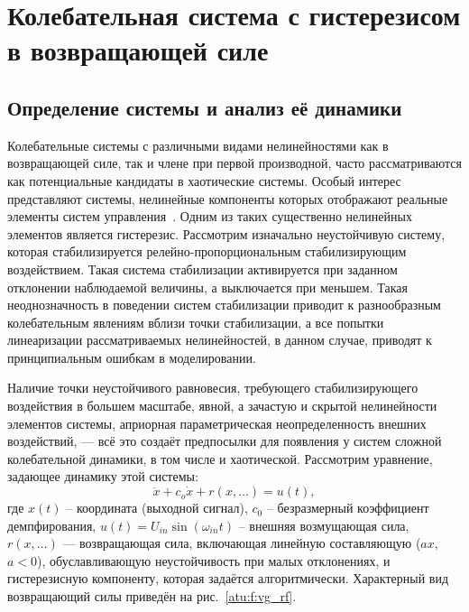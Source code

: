
\FloatBarrier
\section{Колебательная система с гистерезисом в возвращающей силе} %
\label{atu:sect:vglass}


\subsection{Определение системы и анализ её динамики} %

Колебательные системы с различными видами нелинейностями
как в возвращающей силе, так и члене при первой производной,
часто рассматриваются как потенциальные кандидаты в хаотические системы.
Особый интерес представляют системы, нелинейные компоненты которых
отображают реальные элементы систем управления~\cite{atu_st85,atu_ISDMCI2013,atu_asau20}.
Одним из таких существенно нелинейных элементов
является гистерезис. %
Рассмотрим изначально неустойчивую  систему,
которая стабилизируется релейно-пропорциональным
стабилизирующим воздействием.
Такая система стабилизации активируется при заданном отклонении наблюдаемой
величины, а выключается при меньшем. Такая неоднозначность в поведении
систем стабилизации приводит к разнообразным колебательным явлениям вблизи
точки стабилизации, а все попытки линеаризации рассматриваемых
нелинейностей, в данном случае, приводят к принципиальным ошибкам в
моделировании.

Наличие точки неустойчивого равновесия, требующего стабилизирующего
воздействия в большем масштабе, явной, а зачастую и скрытой нелинейности
элементов системы, априорная параметрическая неопределенность внешних
воздействий, --- всё это создаёт предпосылки для появления у систем сложной
колебательной динамики, в том числе и хаотической.
Рассмотрим уравнение, задающее динамику этой системы:
%
\begin{equation}
  \ddot{x} + c_o \dot{x} + r( x, \ldots ) = u(t),
  \label{atu:eq:vglass}
\end{equation}
%
где
$x(t)$ -- координата (выходной сигнал),
$ c_0$ -- безразмерный коэффициент демпфирования,
$u(t) = U_{in} \sin( \omega_{in} t ) $ -- внешняя возмущающая сила,
$r( x, \ldots) $ --- возвращающая сила,
включающая линейную составляющую ($ax$, $a<0$),
обуславливающую неустойчивость при малых отклонениях,
и гистерезисную компоненту, которая задаётся алгоритмически.
Характерный вид возвращающий силы приведён на  рис.~\ref{atu:f:vg_rf}.


